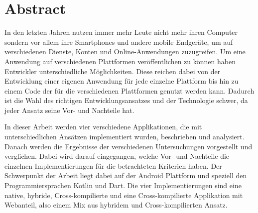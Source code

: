 \chapter*{Abstract}

\bigskip 

In den letzten Jahren nutzen immer mehr Leute nicht mehr ihren Computer sondern vor allem ihre Smartphones und andere mobile Endgeräte, um auf verschiedenen Dienste, Konten und Online-Anwendungen zuzugreifen. Um eine Anwendung auf verschiedenen Plattformen veröffentlichen zu können haben Entwickler unterschiedliche Möglichkeiten. Diese reichen dabei von der Entwicklung einer eigenen Anwendung für jede einzelne Plattform bis hin zu einem Code der für die verschiedenen Plattformen genutzt werden kann. Dadurch ist die Wahl des richtigen Entwicklungsansatzes und der Technologie schwer, da jeder Ansatz seine Vor- und Nachteile hat. 

In dieser Arbeit werden vier verschiedene Applikationen, die mit unterschiedlichen Ansätzen implementiert wurden, beschrieben und analysiert. Danach werden die Ergebnisse der verschiedenen Untersuchungen vorgestellt und verglichen. Dabei wird darauf eingegangen, welche Vor- und Nachteile die einzelnen Implementierungen für die betrachteten Kriterien haben. Der Schwerpunkt der Arbeit liegt dabei auf der Android Plattform und speziell den Programmiersprachen Kotlin und Dart. Die vier Implementierungen sind eine native, hybride, Cross-kompilierte und eine Cross-kompilierte Applikation mit Webanteil, also einem Mix aus hybridem und Cross-kompilierten Ansatz.